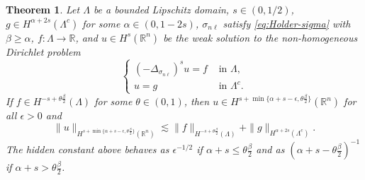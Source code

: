 \documentclass{amsart}
\newcommand{\domain}{\Lambda}
\newcommand{\snl}{{\sigma_{n\ell}}}
\def\R{{\mathbb R}}
\newtheorem{theorem}{Theorem}
\theoremstyle{plain}
\numberwithin{equation}{section}
\numberwithin{table}{section}
\numberwithin{figure}{section}
\numberwithin{theorem}{section}
\numberwithin{corollary}{section}
\numberwithin{definition}{section}
\numberwithin{lemma}{section}
\numberwithin{proposition}{section}
\numberwithin{remark}{section}
\begin{document}
\begin{theorem} \label{thm:reg-nl-s-small}
Let $\domain$ be a bounded Lipschitz domain, $s \in (0,1/2)$, $g \in H^{\alpha+2s}(\domain^c)$ for some $\alpha \in (0, 1-2s)$, $\snl$ satisfy \eqref{eq:Holder-sigma} with $\beta \ge \alpha$, $f\colon \domain \to \R$, and $u \in H^s(\R^n)$ be the weak solution to the non-homogeneous Dirichlet problem
\[
 \left\lbrace \begin{aligned}
(-\Delta_\snl)^s  u = f  & \mbox{ in } \domain, \\
u = g & \mbox{ in } \domain^c.
\end{aligned} \right.
\]
If $f\in H^{-s+\theta \frac\beta{2}}(\domain)$ for some $\theta \in (0,1)$, then $u \in H^{s+\min\{ \alpha+s-\epsilon, \theta\frac\beta2 \}}(\R^n)$  for all $\epsilon > 0$ and
\begin{equation} \label{eq:max-reg-p-big}
\| u \|_{H^{s+\min\{ \alpha+s-\epsilon, \theta\frac\beta2 \}}(\R^n)} \lesssim  \| f  \|_{H^{-s+\theta\frac\beta2}(\domain)} + \| g \|_{H^{\alpha+2s} (\domain^c)}.
\end{equation}
The hidden constant above behaves as $\epsilon^{-1/2}$ if $\alpha+s \le \theta\frac\beta2$ and as $(\alpha+s-\theta\frac\beta2)^{-1}$ if $\alpha +s > \theta \frac\beta{2}$.
\end{theorem}
\end{document}
